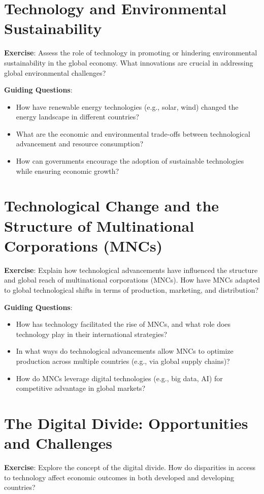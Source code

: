 \documentclass{article}
\begin{document}
\section{Technology and Environmental Sustainability}
\textbf{Exercise}: Assess the role of technology in promoting or hindering environmental sustainability in the global economy. What innovations are crucial in addressing global environmental challenges?

\textbf{Guiding Questions}:
\begin{itemize}
    \item How have renewable energy technologies (e.g., solar, wind) changed the energy landscape in different countries?
    \item What are the economic and environmental trade-offs between technological advancement and resource consumption?
    \item How can governments encourage the adoption of sustainable technologies while ensuring economic growth?
\end{itemize}

\section{Technological Change and the Structure of Multinational Corporations (MNCs)}
\textbf{Exercise}: Explain how technological advancements have influenced the structure and global reach of multinational corporations (MNCs). How have MNCs adapted to global technological shifts in terms of production, marketing, and distribution?

\textbf{Guiding Questions}:
\begin{itemize}
    \item How has technology facilitated the rise of MNCs, and what role does technology play in their international strategies?
    \item In what ways do technological advancements allow MNCs to optimize production across multiple countries (e.g., via global supply chains)?
    \item How do MNCs leverage digital technologies (e.g., big data, AI) for competitive advantage in global markets?
\end{itemize}

\section{The Digital Divide: Opportunities and Challenges}
\textbf{Exercise}: Explore the concept of the digital divide. How do disparities in access to technology affect economic outcomes in both developed and developing countries?
\end{document}
